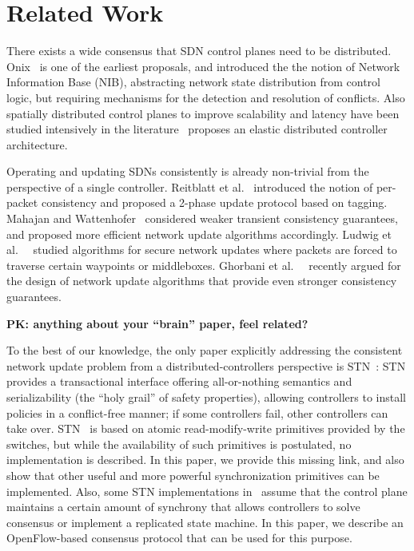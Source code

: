 \documentclass[conference]{sigcomm-alternate}
\begin{document}
\begin{comment}
\section{The Practical Implementation}\label{sec:extension}

\end{comment}

\section{Related Work}\label{sec:relwork}

There exists a wide consensus that SDN control planes need to be distributed.~\cite{onos,onix,elasticon}
Onix~\cite{onix} is one of the earliest proposals, and introduced the
the notion of Network Information Base (NIB), abstracting network state
distribution from control logic, but
requiring mechanisms for the detection and resolution of conflicts.
Also spatially distributed control planes to improve scalability and
latency have been studied intensively
in the literature~\cite{kandoo,ctrl-place,hotsdn13loc}
proposes an elastic distributed controller architecture.

Operating and updating SDNs consistently is already non-trivial
from the perspective of a single controller. Reitblatt et al.~\cite{network-update}
introduced the notion of
per-packet consistency and proposed a 2-phase update protocol based on tagging.
Mahajan and Wattenhofer~\cite{roger-hotnets} considered weaker transient
consistency guarantees, and proposed more efficient network update algorithms
accordingly. Ludwig et al.~~\cite{hotnets14update} studied algorithms for secure
network updates where packets are forced to traverse certain waypoints or
middleboxes. Ghorbani et al.~~\cite{correct-virt} recently argued for the design
of network update algorithms that provide even stronger consistency guarantees.


\textbf{PK: anything about your ``brain'' paper, feel related?}

To the best of our knowledge, the only paper explicitly addressing the consistent
network update problem from a distributed-controllers perspective is STN~\cite{stn}:
STN provides a transactional interface offering all-or-nothing semantics and serializability
(the ``holy grail'' of safety properties), allowing
controllers to install policies in a conflict-free manner; if some controllers fail,
other controllers can take over. STN~\cite{stn} is based on
atomic read-modify-write primitives provided by the switches, but
while the availability of such primitives is postulated, no implementation is
described. In this paper, we provide this missing link, and also show that other useful and
more powerful synchronization primitives can be implemented. 
Also, some STN implementations in~\cite{stn} assume that the control
plane maintains a certain amount of synchrony that allows controllers
to solve consensus or implement a replicated state machine.     
In this paper, we describe an OpenFlow-based consensus protocol that
can be used for this purpose.  
\end{document}
